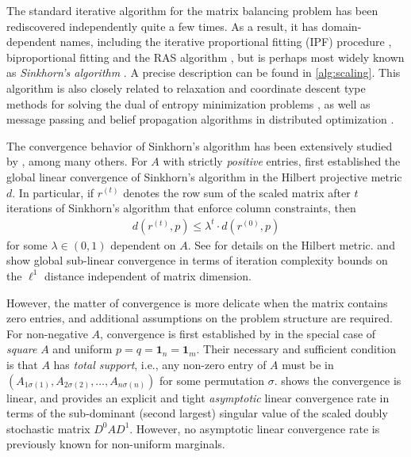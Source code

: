 The standard iterative algorithm for the matrix balancing problem has been rediscovered independently quite a few times. As a result, it has domain-dependent names, including the iterative proportional fitting (IPF) procedure \citep{deming1940least}, biproportional fitting \citep{bacharach1965estimating} and the RAS algorithm \citep{stone1962multiple}, but is perhaps most widely known as \emph{Sinkhorn's algorithm} \citep{sinkhorn1964relationship,cuturi2013sinkhorn}. A precise description can be found in \cref{alg:scaling}.
This algorithm is also closely related to relaxation and coordinate descent type methods for solving the dual of entropy minimization problems \citep{bregman1967relaxation,cottle1986lagrangean,tseng1987relaxation,luo1992convergence}, as well as message passing and belief propagation algorithms in distributed optimization \citep{balakrishnan2004polynomial,agarwal2018accelerated}. 

The convergence behavior of Sinkhorn's algorithm has been extensively studied by \citet{sinkhorn1964relationship,bregman1967proof,lamond1981bregman,franklin1989scaling,ruschendorf1995convergence,kalantari2008complexity,knight2008sinkhorn,pukelsheim2009iterative,altschuler2017near,chakrabarty2021better,leger2021gradient}, among many others. For $A$ with strictly \emph{positive} entries, \citet{franklin1989scaling} first established the global linear convergence of Sinkhorn's algorithm in the Hilbert projective metric $d$. In particular, if $r^{(t)}$ denotes the row sum of the scaled matrix after $t$ iterations of Sinkhorn's algorithm that enforce column constraints, then 
 \begin{align}
 \label{eq:hilbert-contraction} 
   d(r^{(t)}, p) \leq  \lambda^{t} \cdot d(r^{(0)}, p)
 \end{align}
  for some $\lambda \in (0,1)$ dependent on $A$. See \citet{bushell1973hilbert} for details on the Hilbert metric. \citet{altschuler2017near} and \citet{chakrabarty2021better} show global sub-linear convergence in terms of iteration complexity bounds on the $\ell^1$ distance independent of matrix dimension. 
  
  However, the matter of convergence is more delicate when the matrix contains zero entries, and additional assumptions on the problem structure are required. For non-negative $A$, convergence is first established by \citet{sinkhorn1967concerning} in the special case of  \emph{square} $A$ and uniform $p=q=\mathbf{1}_n=\mathbf{1}_m$. Their necessary and sufficient condition is that $A$
has \emph{total support}, i.e., any non-zero entry of $A$ must be in $(A_{1\sigma(1)},A_{2\sigma(2)},\dots,A_{n\sigma(n)})$
for some permutation $\sigma$. \citet{soules1991rate} shows the convergence is linear, and \citet{knight2008sinkhorn} provides an explicit and tight \emph{asymptotic} linear convergence rate in terms of the sub-dominant (second largest) singular value of the scaled doubly stochastic matrix $D^0AD^1$. However, no asymptotic linear convergence rate is previously known for non-uniform marginals.

